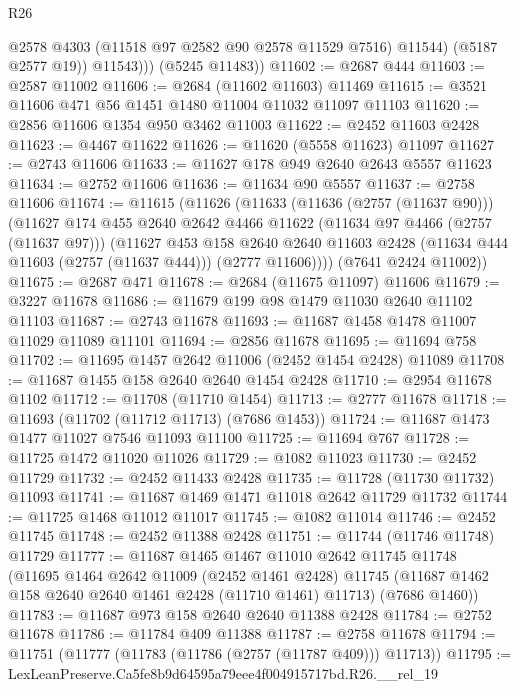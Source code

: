 \begin{lexlean}{R26}
\begin{coremodule}
                @2578
                @4303
                (@11518 @97 @2582 @90 @2578 @11529 @7516)
                @11544)
              (@5187 @2577 @19))
            @11543)))
      (@5245 @11483))
@11602 := @2687 @444
@11603 := @2587 @11002
@11606 := @2684 (@11602 @11603) @11469
@11615 := @3521 @11606 @471 @56 @1451 @1480 @11004 @11032 @11097 @11103
@11620 := @2856 @11606 @1354 @950 @3462 @11003
@11622 := @2452 @11603 @2428
@11623 := @4467 @11622
@11626 := @11620 (@5558 @11623) @11097
@11627 := @2743 @11606
@11633 := @11627 @178 @949 @2640 @2643 @5557 @11623
@11634 := @2752 @11606
@11636 := @11634 @90 @5557
@11637 := @2758 @11606
@11674 := @11615
    (@11626
      (@11633
        (@11636 (@2757 (@11637 @90)))
        (@11627
          @174
          @455
          @2640
          @2642
          @4466
          @11622
          (@11634 @97 @4466 (@2757 (@11637 @97)))
          (@11627
            @453
            @158
            @2640
            @2640
            @11603
            @2428
            (@11634 @444 @11603 (@2757 (@11637 @444)))
            (@2777 @11606))))
      (@7641 @2424 @11002))
@11675 := @2687 @471
@11678 := @2684 (@11675 @11097) @11606
@11679 := @3227 @11678
@11686 := @11679 @199 @98 @1479 @11030 @2640 @11102 @11103
@11687 := @2743 @11678
@11693 := @11687 @1458 @1478 @11007 @11029 @11089 @11101
@11694 := @2856 @11678
@11695 := @11694 @758
@11702 := @11695 @1457 @2642 @11006 (@2452 @1454 @2428) @11089
@11708 := @11687 @1455 @158 @2640 @2640 @1454 @2428
@11710 := @2954 @11678 @1102
@11712 := @11708 (@11710 @1454)
@11713 := @2777 @11678
@11718 := @11693 (@11702 (@11712 @11713) (@7686 @1453))
@11724 := @11687 @1473 @1477 @11027 @7546 @11093 @11100
@11725 := @11694 @767
@11728 := @11725 @1472 @11020 @11026
@11729 := @1082 @11023
@11730 := @2452 @11729
@11732 := @2452 @11433 @2428
@11735 := @11728 (@11730 @11732) @11093
@11741 := @11687 @1469 @1471 @11018 @2642 @11729 @11732
@11744 := @11725 @1468 @11012 @11017
@11745 := @1082 @11014
@11746 := @2452 @11745
@11748 := @2452 @11388 @2428
@11751 := @11744 (@11746 @11748) @11729
@11777 := @11687
    @1465
    @1467
    @11010
    @2642
    @11745
    @11748
    (@11695
      @1464
      @2642
      @11009
      (@2452 @1461 @2428)
      @11745
      (@11687 @1462 @158 @2640 @2640 @1461 @2428 (@11710 @1461) @11713)
      (@7686 @1460))
@11783 := @11687 @973 @158 @2640 @2640 @11388 @2428
@11784 := @2752 @11678
@11786 := @11784 @409 @11388
@11787 := @2758 @11678
@11794 := @11751 (@11777 (@11783 (@11786 (@2757 (@11787 @409))) @11713))
@11795 := LexLeanPreserve.Ca5fe8b9d64595a79eee4f004915717bd.R26.__rel_19

\end{coremodule}
\end{lexlean}
